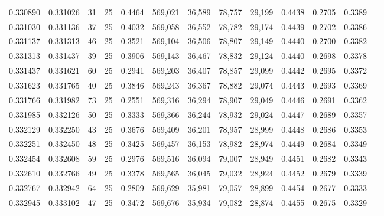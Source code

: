 \begin{tabular}{rrrrrrrrrrrrr}
0.330890 & 0.331026 &    31 &  25 &                                     0.4464 & 569,021 &  36,589 &  78,757 &  29,199 & 0.4438 & 0.2705 & 0.3389 \\
0.331030 & 0.331136 &    37 &  25 &                                     0.4032 & 569,058 &  36,552 &  78,782 &  29,174 & 0.4439 & 0.2702 & 0.3386 \\
0.331137 & 0.331313 &    46 &  25 &                                     0.3521 & 569,104 &  36,506 &  78,807 &  29,149 & 0.4440 & 0.2700 & 0.3382 \\
0.331313 & 0.331437 &    39 &  25 &                                     0.3906 & 569,143 &  36,467 &  78,832 &  29,124 & 0.4440 & 0.2698 & 0.3378 \\
0.331437 & 0.331621 &    60 &  25 &                                     0.2941 & 569,203 &  36,407 &  78,857 &  29,099 & 0.4442 & 0.2695 & 0.3372 \\
0.331623 & 0.331765 &    40 &  25 &                                     0.3846 & 569,243 &  36,367 &  78,882 &  29,074 & 0.4443 & 0.2693 & 0.3369 \\
0.331766 & 0.331982 &    73 &  25 &                                     0.2551 & 569,316 &  36,294 &  78,907 &  29,049 & 0.4446 & 0.2691 & 0.3362 \\
0.331985 & 0.332126 &    50 &  25 &                                     0.3333 & 569,366 &  36,244 &  78,932 &  29,024 & 0.4447 & 0.2689 & 0.3357 \\
0.332129 & 0.332250 &    43 &  25 &                                     0.3676 & 569,409 &  36,201 &  78,957 &  28,999 & 0.4448 & 0.2686 & 0.3353 \\
0.332251 & 0.332450 &    48 &  25 &                                     0.3425 & 569,457 &  36,153 &  78,982 &  28,974 & 0.4449 & 0.2684 & 0.3349 \\
0.332454 & 0.332608 &    59 &  25 &                                     0.2976 & 569,516 &  36,094 &  79,007 &  28,949 & 0.4451 & 0.2682 & 0.3343 \\
0.332610 & 0.332766 &    49 &  25 &                                     0.3378 & 569,565 &  36,045 &  79,032 &  28,924 & 0.4452 & 0.2679 & 0.3339 \\
0.332767 & 0.332942 &    64 &  25 &                                     0.2809 & 569,629 &  35,981 &  79,057 &  28,899 & 0.4454 & 0.2677 & 0.3333 \\
0.332945 & 0.333102 &    47 &  25 &                                     0.3472 & 569,676 &  35,934 &  79,082 &  28,874 & 0.4455 & 0.2675 & 0.3329 \\

\end{tabular}

